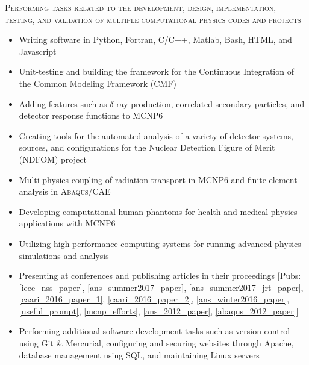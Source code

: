\begin{center}
	\begin{minipage}{0.99\textwidth}
		\begin{center}
			\textsc{\Large Performing tasks related to the development, design, implementation, testing, and validation of multiple computational physics codes and projects} \vspace{2mm}
		\end{center}
	\end{minipage}
\end{center}
\begin{minipage}{\textwidth}
	\begin{center}
		\begin{itemize}
			\item Writing software in Python, Fortran, C/C++, Matlab, Bash, HTML, and Javascript
			\item Unit-testing and building the framework for the Continuous Integration of the Common Modeling Framework (CMF)
			\item Adding features such as $\delta$-ray production, correlated secondary particles, and detector response functions to \textsc{MCNP6} 
			\item Creating tools for the automated analysis of a variety of detector systems, sources, and configurations for the Nuclear Detection Figure of Merit (NDFOM) project
	    		\item Multi-physics coupling of radiation transport in \textsc{MCNP6} and finite-element analysis in \textsc{Abaqus/CAE} %
	    		\item Developing computational human phantoms for health and medical physics applications with \textsc{MCNP6} 
			\item Utilizing high performance computing systems for running advanced physics simulations and analysis
			\item Presenting at conferences and publishing articles in their proceedings [Pubs: \ref{ieee_nss_paper}, \ref{ans_summer2017_paper}, \ref{ans_summer2017_jrt_paper}, \ref{caari_2016_paper_1}, \ref{caari_2016_paper_2}, \ref{ans_winter2016_paper}, \ref{useful_prompt}, \ref{mcnp_efforts}, \ref{ans_2012_paper}, \ref{abaqus_2012_paper}]
			\item Performing additional software development tasks such as version control using Git \& Mercurial, configuring and securing websites through Apache, database management using SQL, and maintaining Linux servers
		\end{itemize}
	\end{center}
\end{minipage}

